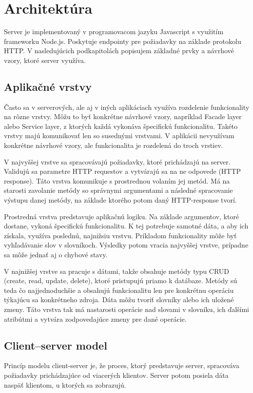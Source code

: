 \documentclass[
  digital, %
  table,   %
  lof,     %
  lot,     %
]{fithesis3}
\begin{document}
\section{Architektúra}
Server je implementovaný v programovacom jazyku Javascript s využitím frameworku Node.js. Poskytuje endpointy pre požiadavky na základe protokolu HTTP. V nasledujúcich podkapitolách popisujem základné prvky a návrhové vzory, ktoré server využíva.

\subsection{Aplikačné vrstvy}
Často sa v serverových, ale aj v iných aplikáciach využíva rozdelenie funkcionality na rôzne vrstvy. Môžu to byť konkrétne návrhové vzory, napríklad Facade layer alebo Service layer, z ktorých každá vykonáva špecifickú funkcionalitu. Takéto vrstvy majú komunikovať len so susednými vrstvami. V aplikácii nevyužívam konkrétne návrhové vzory, ale funkcionalita je rozdelená do troch vrstiev.

V najvyššej vrstve sa spracovávajú požiadavky, ktoré prichádzajú na server. Validujú sa parametre HTTP requestov a vytvárajú sa na ne odpovede (HTTP response). Táto vrstva komunikuje s prostrednou volaním jej metód. Má na starosti zavolanie metódy so správnymi argumentami a následné spracovanie výstupu danej metódy, na základe ktorého potom daný HTTP-response tvorí.

Prostredná vrstva predstavuje aplikačnú logiku. Na základe argumentov, ktoré dostane, vykoná špecifickú funkcionalitu. K tej potrebuje samotné dáta, a aby ich získala, využíva poslednú, najnižsiu vrstvu. Príkladom funkcionality môže byť vyhľadávanie slov v slovníkoch. Výsledky potom vracia najvyššej vrstve, prípadne sa môže jednať aj o chybové stavy.

V najnižšej vrstve sa pracuje s dátami, takže obsahuje metódy typu CRUD (create, read, update, delete), ktoré pristupujú priamo k datábaze. Metódy sú teda čo najjednoduchšie a obsahujú funkcionalitu len pre konkrétnu operáciu týkajúcu sa konkrétneho zdroja. Dáta môžu tvoriť slovníky alebo ich uložené zmeny. Táto vrstva tak má nastarosti operácie nad slovami v slovníku, ich ďalšími atribútmi a vytvára zodpovedajúce zmeny pre dané operácie.

\subsection{Client–server model}
Princíp modelu client-server je, že proces, ktorý predstavuje server, spracováva požiadavky prichádzajúce od viacerých klientov. Server potom posiela dáta naspäť klientom, u ktorých sa zobrazujú.
\end{document}
